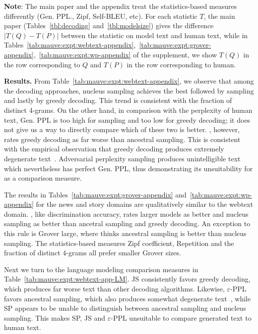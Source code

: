 \documentclass{article}
\newcommand{\myparagraph}[1]{\par\noindent\textbf{{#1}.}} %
\theoremstyle{definition}
\newcommand \eps \varepsilon
\newcommand{\name}{{\fontfamily{bch}\selectfont{\textsc{Mauve}}}\xspace}
\begin{document}
\textbf{Note}: The main paper and the appendix treat the statistics-based measures differently (Gen. PPL., Zipf, Self-BLEU, etc). 
For each statistic $T$, the main paper (Tables~\ref{tbl:decoding} and~\ref{tbl:modelsize}) 
gives the difference $|T(Q)-T(P)|$ between the statistic on model text and human text, 
while in Tables~\ref{tab:mauve:expt:webtext-appendix},~\ref{tab:mauve:expt:grover-appendix},~\ref{tab:mauve:expt:wp-appendix} of the supplement, we show $T(Q)$ in the row corresponding to $Q$ and $T(P)$ in the row corresponding to human. 

\myparagraph{Results}
From Table~\ref{tab:mauve:expt:webtext-appendix},
we observe that among the decoding
approaches, nucleus sampling achieves the best
\name followed by sampling and lastly by greedy
decoding. This trend is consistent with the fraction
of distinct 4-grams. On the other hand, in comparison with the perplexity of human text, Gen. PPL
is too high for sampling and too low for greedy
decoding; it does not give us a way to directly
compare which of these two is better. \name,
however, rates greedy decoding as far worse than
ancestral sampling. This is consistent with the empirical observation that greedy decoding produces
extremely degenerate text~\cite{welleck2020neural}.
Adversarial perplexity sampling produces unintelligible text which nevertheless has perfect Gen.
PPL, thus demonstrating its unsuitability for 
as a comparison measure. 

The results in Tables~\ref{tab:mauve:expt:grover-appendix} and~\ref{tab:mauve:expt:wp-appendix} for the news and story domains are qualitatively similar to the webtext domain. 
\name, like discrimination accuracy, rates larger models as better and nucleus sampling as better than ancetral sampling and greedy decoding. An exception to this rule is Grover large, where \name thinks ancestral sampling is better than nucleus sampling. The statistics-based measures Zipf coefficient, Repetition and the fraction of distinct $4$-grams all prefer smaller Grover sizes.

Next we turn to the language modeling comparison measures
in Table~\ref{tab:mauve:expt:webtext-app-LM}. 
JS consistently favors greedy decoding,
which produces far worse text than other decoding algorithms. Likewise, $\eps$-PPL favors ancestral sampling, which also produces somewhat degenerate
text~\cite{holtzman2019curious}, while SP appears to
be unable to distinguish between ancestral sampling and nucleus sampling. This makes SP, JS and $\eps$-PPL unsuitable to compare generated text to human text.
\end{document}
